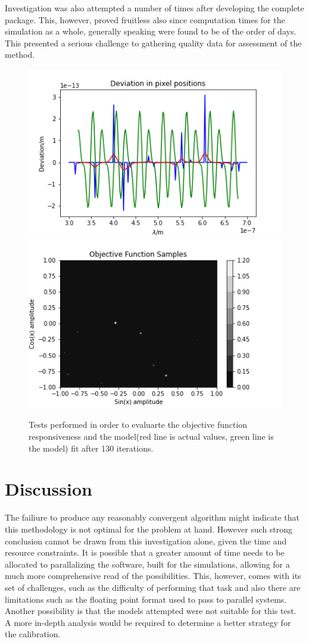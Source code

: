 \documentclass[12pt]{article}
\begin{document}
    Investigation was also attempted a number of times after developing the complete 
    package. This, however, proved fruitless also since computation times for the simulation
    as a whole, generally speaking were found to be of the order of days. This presented 
    a serious challenge to gathering quality data for assessment of the method. 
    \begin{figure}
        \centering
        \includegraphics[scale=0.4]{fit.png}
        \includegraphics[scale=0.4]{Sinusoid_objective_func (2).png}
        \caption{Tests performed in order to evaluarte the objective function
        responsiveness and the model(red line is actual values, green line is the model) fit after 130 iterations.}
    \end{figure}
\section{Discussion}
    The failiure to produce any reasonably convergent algorithm might indicate that
    this methodology is not optimal for the problem at hand. However such strong
    conclusion cannot be drawn from this investigation alone, given the time and resource
    constraints. It is possible that a greater amount of time needs to be allocated 
    to parallalizing the software, built for the simulations, allowing for a 
    much more comprehensive read of the possibilities. This, however, comes with its 
    set of challenges, such as the difficulty of performing that task and also there 
    are limitations such as the floating point format used to pass to parallel systems. 
    Another possibility is that the models attempted were not suitable for this test. A more in-depth
    analysis would be required to determine a better strategy for the calibration.

{}
\end{document}
